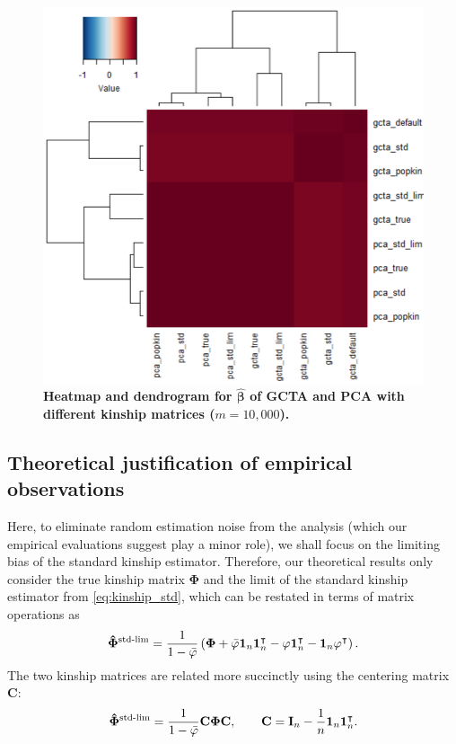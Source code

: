 \documentclass[11pt]{article}
\newcommand{\kinMat}{%
  \ensuremath{%
    \mathbf{\Phi}
  }%
  \xspace%
}%
\newcommand{\kinMatStdLim}{%
  \ensuremath{%
    \mathbf{\hat{\Phi}}^\text{std-lim}
  }%
  \xspace%
}%
\begin{document}
\begin{figure}[bp!]
  \centering
  \includegraphics[width=6in]{all_beta_hat.pdf}
  \caption{
    {\bf Heatmap and dendrogram for $\hat{\mathbf{\beta}}$ of GCTA and PCA with different kinship matrices ($m=10,000$).}
  }
  \label{fig:all_beta_hat}
\end{figure}


\subsection{Theoretical justification of empirical observations}

Here, to eliminate random estimation noise from the analysis (which our empirical evaluations suggest play a minor role), we shall focus on the limiting bias of the standard kinship estimator.
Therefore, our theoretical results only consider the true kinship matrix \kinMat and the limit of the standard kinship estimator from \cref{eq:kinship_std}, which can be restated in terms of matrix operations as
$$
\kinMatStdLim
=
\frac{1}{1 - \bar{\varphi}}
\left(
  \kinMat
  + \bar{\varphi} \mathbf{1}_n \mathbf{1}_n^\intercal 
  - \mathbf{\varphi} \mathbf{1}_n^\intercal 
  - \mathbf{1}_n \mathbf{\varphi}^\intercal 
\right)
.
$$
The two kinship matrices are related more succinctly using the centering matrix $\mathbf{C}$:
$$
\kinMatStdLim
=
\frac{1}{1 - \bar{\varphi}}
\mathbf{C} \kinMat \mathbf{C}
, \quad\quad
\mathbf{C}
=
\mathbf{I}_n - \frac{1}{n} \mathbf{1}_n \mathbf{1}_n^\intercal
.
$$
\end{document}
